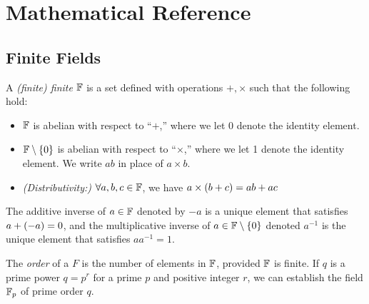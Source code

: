 

\appendix

\section{Mathematical Reference} %
\label{sec:mathematical_reference}


\subsection{Finite Fields} %
\label{sub:finite_fields}


\begin{definition}
A \emph{(finite) finite} $\mathbb{F}$ is a set defined with operations $+, \times$ such that the following hold:
\begin{itemize}
	\item $\mathbb{F}$ is abelian with respect to ``$+$,'' where we let 0 denote the identity element.
	\item $\mathbb{F} \setminus \left\{0\right\}$ is abelian with respect to ``$\times$,'' where we let 1 denote the identity element. We write $ab$ in place of $a \times b$.
	\item \emph{(Distributivity:) }$\forall a, b, c \in \mathbb{F}$, we have $a \times \left(b + c\right) = ab + ac$
\end{itemize}
\end{definition}
The additive inverse of $a \in \mathbb{F}$ denoted by $-a$ is a unique element that satisfies $a + \left(-a\right) = 0$, and the multiplicative inverse of $a \in \mathbb{F} \setminus \left\{0\right\}$ denoted $a^{-1}$ is the unique element that satisfies $a a^{-1} = 1$.

The \emph{order} of a $F$ is the number of elements in $\mathbb{F}$, provided $\mathbb{F}$ is finite. If $q$ is a prime power $q = p^r$ for a prime $p$ and positive integer $r$, we can establish the field $\mathbb{F}_p$ of prime order $q$.